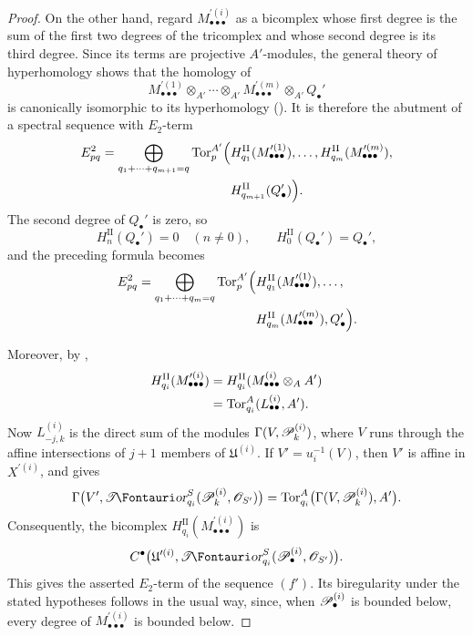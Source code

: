 \begin{proof}
On the other hand, regard
$M_{\bullet\bullet\bullet}^{\prime(i)}$ as a bicomplex whose first
degree is the sum of the first two degrees of the tricomplex and
whose second degree is its third degree.  Since its terms are
projective $A'$-modules, the general theory of hyperhomology shows
that the homology of
\[
  M_{\bullet\bullet\bullet}^{\prime(1)}
  \otimes_{A'}\cdots\otimes_{A'}
  M_{\bullet\bullet\bullet}^{\prime(m)}
  \otimes_{A'}Q_\bullet'
\]
is canonically isomorphic to its hyperhomology
().  It is therefore the abutment of a spectral
sequence with $E_2$-term
\[
\begin{split}
  E_{pq}^2
  =
  \bigoplus_{q_1+\cdots+q_{m+1}=q}
  \operatorname{Tor}_p^{A'}
  \Bigl(
    &
    H_{q_1}^{\mathrm{II}}
    (M_{\bullet\bullet\bullet}^{\prime(1)}),\ldots,
    H_{q_m}^{\mathrm{II}}
    (M_{\bullet\bullet\bullet}^{\prime(m)}),
    \\
    &
    H_{q_{m+1}}^{\mathrm{II}}(Q_\bullet')
  \Bigr).
\end{split}
\]
The second degree of $Q_\bullet'$ is zero, so
\[
  H_n^{\mathrm{II}}(Q_\bullet')=0
  \quad(n\neq0),
  \qquad
  H_0^{\mathrm{II}}(Q_\bullet')=Q_\bullet',
\]
and the preceding formula becomes
\[
\begin{split}
  E_{pq}^2
  =
  \bigoplus_{q_1+\cdots+q_m=q}
  \operatorname{Tor}_p^{A'}
  \Bigl(
    &
    H_{q_1}^{\mathrm{II}}
    (M_{\bullet\bullet\bullet}^{\prime(1)}),\ldots,
    \\
    &
    H_{q_m}^{\mathrm{II}}
    (M_{\bullet\bullet\bullet}^{\prime(m)}),
    Q_\bullet'
  \Bigr).
\end{split}
\]

Moreover, by ,
\[
\begin{split}
  H_{q_i}^{\mathrm{II}}
  (M_{\bullet\bullet\bullet}^{\prime(i)})
  &=
  H_{q_i}^{\mathrm{II}}
  (M_{\bullet\bullet\bullet}^{(i)}\otimes_AA')
  \\
  &=
  \operatorname{Tor}_{q_i}^A(L_{\bullet\bullet}^{(i)},A').
\end{split}
\]
Now $L_{-j,k}^{(i)}$ is the direct sum of the modules
$\Gamma(V,\mathscr{P}_k^{(i)})$, where $V$ runs through the affine
intersections of $j+1$ members of $\mathfrak U^{(i)}$.  If
$V'=u_i^{-1}(V)$, then $V'$ is affine in $X^{\prime(i)}$, and
 gives
\[
  \Gamma
  \bigl(
    V',
    \shTor_{q_i}^S
    (\sh P_k^{(i)},\sh O_{S'})
  \bigr)
  =
  \Tor_{q_i}^A
  \bigl(
    \Gamma(V,\sh P_k^{(i)}),A'
  \bigr).
\]
Consequently, the bicomplex
$H_{q_i}^{\mathrm{II}}
(M_{\bullet\bullet\bullet}^{\prime(i)})$
is
\[
  C^\bullet
  \bigl(
    \mathfrak U^{\prime(i)},
    \shTor_{q_i}^S
    (\sh P_\bullet^{(i)},\sh O_{S'})
  \bigr).
\]
This gives the asserted $E_2$-term of the sequence $(f')$.  Its
biregularity under the stated hypotheses follows in the usual way,
since, when $\mathscr{P}_\bullet^{(i)}$ is bounded below, every degree of
$M_{\bullet\bullet\bullet}^{\prime(i)}$ is bounded below.
\end{proof}

